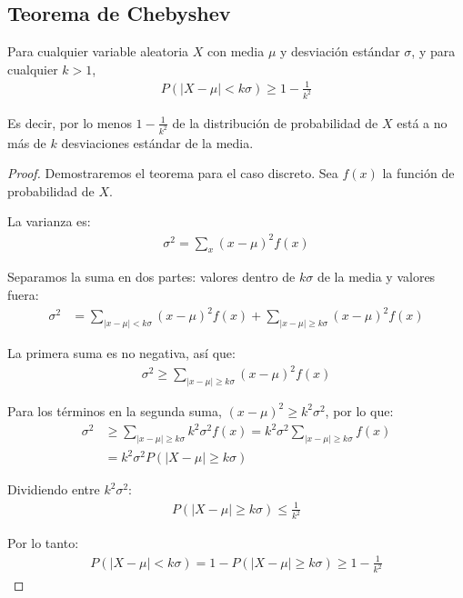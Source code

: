 \subsection{Teorema de Chebyshev}

\begin{teorema}[Chebyshev]
	Para cualquier variable aleatoria $X$ con media $\mu$ y desviación estándar $\sigma$, y para cualquier $k > 1$,
	\begin{align}
		P(|X - \mu| < k\sigma) \geq 1 - \frac{1}{k^2}
	\end{align}
	
	Es decir, por lo menos $1 - \frac{1}{k^2}$ de la distribución de probabilidad de $X$ está a no más de $k$ desviaciones estándar de la media.
\end{teorema}

\begin{proof}
	Demostraremos el teorema para el caso discreto. Sea $f(x)$ la función de probabilidad de $X$.
	
	La varianza es:
	\begin{align}
		\sigma^2 = \sum_{x} (x - \mu)^2 f(x)
	\end{align}
	
	Separamos la suma en dos partes: valores dentro de $k\sigma$ de la media y valores fuera:
	\begin{align}
		\sigma^2 &= \sum_{|x-\mu| < k\sigma} (x-\mu)^2 f(x) + \sum_{|x-\mu| \geq k\sigma} (x-\mu)^2 f(x)
	\end{align}
	
	La primera suma es no negativa, así que:
	\begin{align}
		\sigma^2 \geq \sum_{|x-\mu| \geq k\sigma} (x-\mu)^2 f(x)
	\end{align}
	
	Para los términos en la segunda suma, $(x-\mu)^2 \geq k^2\sigma^2$, por lo que:
	\begin{align}
		\sigma^2 &\geq \sum_{|x-\mu| \geq k\sigma} k^2\sigma^2 f(x) = k^2\sigma^2 \sum_{|x-\mu| \geq k\sigma} f(x) \\
		&= k^2\sigma^2 P(|X-\mu| \geq k\sigma)
	\end{align}
	
	Dividiendo entre $k^2\sigma^2$:
	\begin{align}
		P(|X-\mu| \geq k\sigma) \leq \frac{1}{k^2}
	\end{align}
	
	Por lo tanto:
	\begin{align}
		P(|X-\mu| < k\sigma) = 1 - P(|X-\mu| \geq k\sigma) \geq 1 - \frac{1}{k^2}
	\end{align}
\end{proof}

